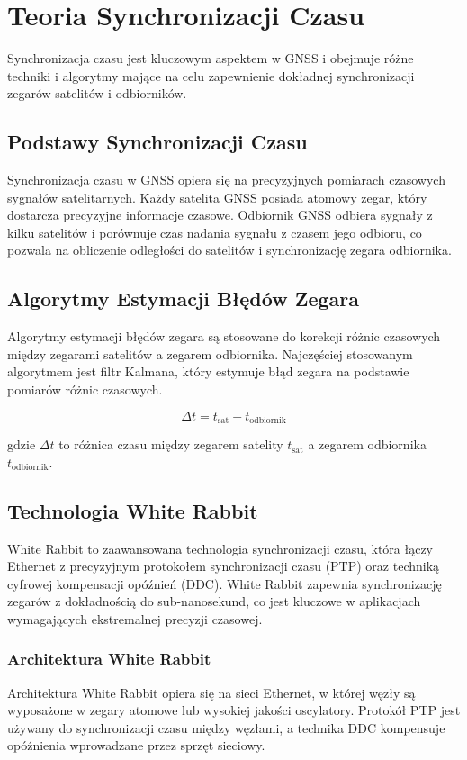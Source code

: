 \section{Teoria Synchronizacji Czasu}
Synchronizacja czasu jest kluczowym aspektem w GNSS i obejmuje różne techniki i algorytmy mające na celu zapewnienie dokładnej synchronizacji zegarów satelitów i odbiorników.

\subsection{Podstawy Synchronizacji Czasu}
Synchronizacja czasu w GNSS opiera się na precyzyjnych pomiarach czasowych sygnałów satelitarnych. Każdy satelita GNSS posiada atomowy zegar, który dostarcza precyzyjne informacje czasowe. Odbiornik GNSS odbiera sygnały z kilku satelitów i porównuje czas nadania sygnału z czasem jego odbioru, co pozwala na obliczenie odległości do satelitów i synchronizację zegara odbiornika.

\subsection{Algorytmy Estymacji Błędów Zegara}
Algorytmy estymacji błędów zegara są stosowane do korekcji różnic czasowych między zegarami satelitów a zegarem odbiornika. Najczęściej stosowanym algorytmem jest filtr Kalmana, który estymuje błąd zegara na podstawie pomiarów różnic czasowych.

\[
\Delta t = t_{\text{sat}} - t_{\text{odbiornik}}
\]

gdzie \( \Delta t \) to różnica czasu między zegarem satelity \( t_{\text{sat}} \) a zegarem odbiornika \( t_{\text{odbiornik}} \).

\subsection{Technologia White Rabbit}
White Rabbit to zaawansowana technologia synchronizacji czasu, która łączy Ethernet z precyzyjnym protokołem synchronizacji czasu (PTP) oraz techniką cyfrowej kompensacji opóźnień (DDC). White Rabbit zapewnia synchronizację zegarów z dokładnością do sub-nanosekund, co jest kluczowe w aplikacjach wymagających ekstremalnej precyzji czasowej.

\subsubsection{Architektura White Rabbit}
Architektura White Rabbit opiera się na sieci Ethernet, w której węzły są wyposażone w zegary atomowe lub wysokiej jakości oscylatory. Protokół PTP jest używany do synchronizacji czasu między węzłami, a technika DDC kompensuje opóźnienia wprowadzane przez sprzęt sieciowy.

